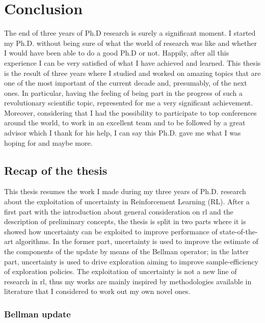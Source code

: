 \chapter{Conclusion}
The end of three years of Ph.D research is surely a significant moment. I started my Ph.D. without being sure of what the world of research was like and whether I would have been able to do a good Ph.D or not. Happily, after all this experience I can be very satisfied of what I have achieved and learned.
This thesis is the result of three years where I studied and worked on amazing topics that are one of the most important of the current decade and, presumably, of the next ones. In particular, having the feeling of being part in the progress of such a revolutionary scientific topic, represented for me a very significant achievement. Moreover, considering that I had the possibility to participate to top conferences around the world, to work in an excellent team and to be followed by a great advisor which I thank for his help, I can say this Ph.D. gave me what I was hoping for and maybe more.

\section{Recap of the thesis}
This thesis resumes the work I made during my three years of Ph.D. research about the exploitation of uncertainty in Reinforcement Learning (RL). After a first part with the introduction about general consideration on \gls{rl} and the description of preliminary concepts, the thesis is split in two parts where it is showed how uncertainty can be exploited to improve performance of state-of-the-art algorithms. In the former part, uncertainty is used to improve the estimate of the components of the update by means of the Bellman operator; in the latter part, uncertainty is used to drive exploration aiming to improve sample-efficiency of exploration policies. The exploitation of uncertainty is not a new line of research in \gls{rl}, thus my works are mainly inspired by methodologies available in literature that I considered to work out my own novel ones.

\subsection{Bellman update}
